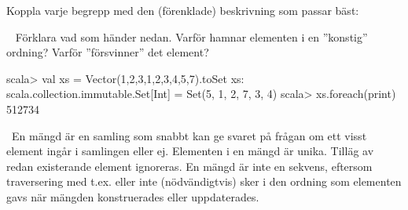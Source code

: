 
\ifPreSolution


\Exercise{\ExeWeekNINE}\label{exe:W09}

\begin{Goals}

\end{Goals}

\begin{Preparations}
\item {}
\end{Preparations}

\else

\ExerciseSolution{\ExeWeekNINE}

\fi



\BasicTasks %





\QUESTBEGIN

\Task \what

\vspace{1em}\noindent Koppla varje begrepp med den (förenklade) beskrivning som passar bäst:

\begin{ConceptConnections}

\end{ConceptConnections}

\SOLUTION

\TaskSolved \what

\begin{ConceptConnections}

\end{ConceptConnections}

\QUESTEND



\QUESTBEGIN

\Task \what~ Förklara vad som händer nedan. Varför hamnar elementen i en ''konstig'' ordning? Varför ''försvinner'' det element?

\begin{REPL}
scala> val xs = Vector(1,2,3,1,2,3,4,5,7).toSet
xs: scala.collection.immutable.Set[Int] = Set(5, 1, 2, 7, 3, 4)
scala> xs.foreach(print)
512734
\end{REPL}

\SOLUTION

\TaskSolved \what~En mängd är en samling som snabbt kan ge svaret på frågan om ett visst element ingår i samlingen eller ej. Elementen i en mängd är unika. Tilläg av redan existerande element ignoreras. En mängd är inte en  sekvens, eftersom traversering med t.ex.  eller  inte (nödvändigtvis) sker i den ordning som elementen gavs när mängden konstruerades eller uppdaterades.

